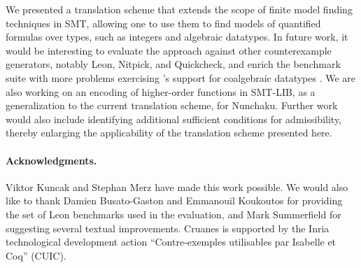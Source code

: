 We presented a translation scheme that extends the scope of finite model finding
techniques in SMT, allowing one to use them to find models of quantified formulas
over  types, such as integers and algebraic datatypes.
%
In future work, it would be interesting to evaluate the approach against other
counterexample generators, notably Leon, Nitpick, and Quickcheck,
and enrich the benchmark suite with more problems exercising \cvc's support for
coalgebraic datatypes \cite{reynolds-blanchette-2015-codata}.
We are also working on an encoding of higher-order functions in SMT-LIB, as a
generalization to the current translation scheme, for Nunchaku. Further work
would also include identifying additional sufficient conditions for
admissibility, thereby enlarging the applicability of the translation scheme
presented here.


{\footnotesize

\def\ackname{Acknowledgments}
\paragraph{%
\ackname.}
Viktor Kuncak and Stephan Merz have made this work possible. We would also like
to thank Damien Busato-Gaston and Emmanouil Koukoutos for providing the
set of Leon benchmarks used in the evaluation, 
and
Mark Summerfield for suggesting
several textual improvements. %
Cruanes is supported by the Inria technological
development action ``Contre-exemples utilisables par Isabelle et Coq'' (CUIC).

}
%

{


}



